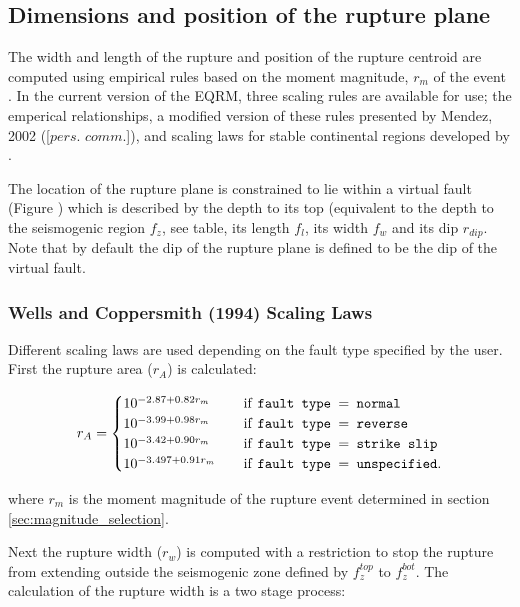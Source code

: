 \subsection{Dimensions and position of the rupture plane}
\label{sec:dim-rupture}

The width and length of the rupture and position of the rupture
centroid are computed using empirical
rules based on the moment magnitude, $r_m$ of the event . In the current version of the EQRM, three scaling 
rules are available for use; the \citet{eqrm_Wells94} emperical relationships, a modified version
of these rules presented by Mendez, 2002 ([$\textit{pers. comm.}$]), and scaling laws for stable continental regions developed by \citet{eqrm_Leonard10}.

The location of the rupture plane
is constrained to lie within a virtual fault (Figure )
which is described by the depth to its top (equivalent to the
depth to the seismogenic region $f_z$, see
table, its length $f_l$, its width
$f_w$ and its dip $r_{dip}$. Note that by default the dip of the
 rupture plane is defined to be the dip of the virtual fault. 

\subsubsection{Wells and Coppersmith (1994) Scaling Laws}

Different scaling laws are used depending on the fault type specified by the user. First the rupture area ($r_A$) is calculated:

\begin{equation} \label{ra}
r_A = 
\begin{cases}
10^{-2.87 + 0.82r_m}	& \quad \mbox{if \texttt{fault type $=$  normal}} \\
10^{-3.99 + 0.98r_m}	& \quad \mbox{if \texttt{fault type $=$  reverse}} \\
10^{-3.42 + 0.90r_m}	& \quad \mbox{if \texttt{fault type $=$  strike slip}} \\
10^{-3.497 + 0.91r_m}	& \quad \mbox{if \texttt{fault type $=$  unspecified}} . \\
\end{cases}
\end{equation}

where $r_m$ is the moment magnitude of the rupture event determined in section \ref{sec:magnitude_selection}. 

Next the rupture width ($r_w$) is computed with a restriction to stop the rupture from extending 
outside the seismogenic zone defined by $f_z^{top}$ to $f_z^{bot}$. The calculation of the rupture width is a two stage process:


